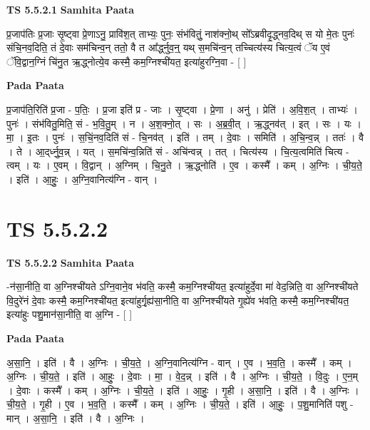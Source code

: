 \documentclass[17pt]{extarticle}
\begin{document}
\textbf{TS 5.5.2.1 } \newline
\textbf{Samhita Paata} \newline

प्र॒जाप॑तिः प्र॒जाः सृ॒ष्ट्वा प्रे॒णाऽनु॒ प्रावि॑श॒त् ताभ्यः॒ पुनः॒ संभ॑वितुं॒ नाश॑क्नो॒थ् सो᳚ऽब्रवीदृ॒द्ध्नव॒दिथ् स यो मे॒तः पुनः॑ संचि॒नव॒दिति॒ तं दे॒वाः सम॑चिन्व॒न् ततो॒ वै त आ᳚र्द्ध्नुव॒न्॒ यथ् स॒मचि॑न्व॒न् तच्चित्य॑स्य चित्य॒त्वं ॅय ए॒वं ॅवि॒द्वान॒ग्निं चि॑नु॒त ऋ॒द्ध्नोत्ये॒व कस्मै॒ कम॒ग्निश्ची॑यत॒ इत्या॑हुरग्नि॒वा - [  ] \newline

\textbf{Pada Paata} \newline

प्र॒जाप॑ति॒रिति॑ प्र॒जा - प॒तिः॒ । प्र॒जा इति॑ प्र - जाः । सृ॒ष्ट्वा । प्रे॒णा । अनु॑ । प्रेति॑ । अ॒वि॒श॒त् । ताभ्यः॑ । पुनः॑ । संभ॑वितु॒मिति॒ सं - भ॒वि॒तु॒म् । न । अ॒श॒क्नो॒त् । सः । अ॒ब्र॒वी॒त् । ऋ॒द्ध्नव॑त् । इत् । सः । यः । मा॒ । इ॒तः । पुनः॑ । स॒चिं॒नव॒दिति॑ सं - चि॒नव॑त् । इति॑ । तम् । दे॒वाः । समिति॑ । अ॒चि॒न्व॒न्न् । ततः॑ । वै । ते । आ॒द्‌र्ध्नु॒व॒न्न् । यत् । स॒मचि॑न्व॒न्निति॑ सं - अचि॑न्वन्न् । तत् । चित्य॑स्य । चि॒त्य॒त्वमिति॑ चित्य - त्वम् । यः । ए॒वम् । वि॒द्वान् । अ॒ग्निम् । चि॒नु॒ते । ऋ॒द्ध्नोति॑ । ए॒व । कस्मै᳚ । कम् । अ॒ग्निः । ची॒य॒ते॒ । इति॑ । आ॒हुः॒ । अ॒ग्नि॒वानित्य॑ग्नि - वान् ।  \newline





\section{ TS 5.5.2.2 }

\textbf{TS 5.5.2.2 } \newline
\textbf{Samhita Paata} \newline

-न॑सा॒नीति॒ वा अ॒ग्निश्ची॑यते ऽग्नि॒वाने॒व भ॑वति॒ कस्मै॒ कम॒ग्निश्ची॑यत॒ इत्या॑हुर्दे॒वा मा॑ वेद॒न्निति॒ वा अ॒ग्निश्ची॑यते वि॒दुरे॑नं दे॒वाः कस्मै॒ कम॒ग्निश्ची॑यत॒ इत्या॑हुर्गृ॒ह्य॑सा॒नीति॒ वा अ॒ग्निश्ची॑यते गृ॒ह्ये॑व भ॑वति॒ कस्मै॒ कम॒ग्निश्ची॑यत॒ इत्या॑हुः पशु॒मान॑सा॒नीति॒ वा अ॒ग्नि - [  ] \newline

\textbf{Pada Paata} \newline

अ॒सा॒नि॒ । इति॑ । वै । अ॒ग्निः । ची॒य॒ते॒ । अ॒ग्नि॒वानित्य॑ग्नि - वान् । ए॒व । भ॒व॒ति॒ । कस्मै᳚ । कम् । अ॒ग्निः । ची॒य॒ते॒ । इति॑ । आ॒हुः॒ । दे॒वाः । मा॒ । वे॒द॒न्न् । इति॑ । वै । अ॒ग्निः । ची॒य॒ते॒ । वि॒दुः । ए॒न॒म् । दे॒वाः । कस्मै᳚ । कम् । अ॒ग्निः । ची॒य॒ते॒ । इति॑ । आ॒हुः॒ । गृ॒ही । अ॒सा॒नि॒ । इति॑ । वै । अ॒ग्निः । ची॒य॒ते॒ । गृ॒ही । ए॒व । भ॒व॒ति॒ । कस्मै᳚ । कम् । अ॒ग्निः । ची॒य॒ते॒ । इति॑ । आ॒हुः॒ । प॒शु॒मानिति॑ पशु - मान् । अ॒सा॒नि॒ । इति॑ । वै । अ॒ग्निः ।  \newline
\end{document}
